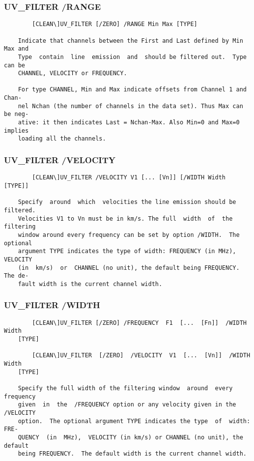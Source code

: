 \subsubsection{UV\_FILTER /RANGE}
\begin{verbatim}
        [CLEAN\]UV_FILTER [/ZERO] /RANGE Min Max [TYPE]

    Indicate that channels between the First and Last defined by Min Max and
    Type  contain  line  emission  and  should be filtered out.  Type can be
    CHANNEL, VELOCITY or FREQUENCY.

    For type CHANNEL, Min and Max indicate offsets from Channel 1 and  Chan-
    nel Nchan (the number of channels in the data set). Thus Max can be neg-
    ative: it then indicates Last = Nchan-Max. Also Min=0 and Max=0  implies
    loading all the channels.

\end{verbatim}
\subsubsection{UV\_FILTER /VELOCITY}
\begin{verbatim}
        [CLEAN\]UV_FILTER /VELOCITY V1 [... [Vn]] [/WIDTH Width [TYPE]]

    Specify  around  which  velocities the line emission should be filtered.
    Velocities V1 to Vn must be in km/s. The full  width  of  the  filtering
    window around every frequency can be set by option /WIDTH.  The optional
    argument TYPE indicates the type of width: FREQUENCY (in MHz),  VELOCITY
    (in  km/s)  or  CHANNEL (no unit), the default being FREQUENCY.  The de-
    fault width is the current channel width.

\end{verbatim}
\subsubsection{UV\_FILTER /WIDTH}
\begin{verbatim}
        [CLEAN\]UV_FILTER [/ZERO] /FREQUENCY  F1  [...  [Fn]]  /WIDTH  Width
    [TYPE]

        [CLEAN\]UV_FILTER  [/ZERO]  /VELOCITY  V1  [...  [Vn]]  /WIDTH Width
    [TYPE]

    Specify the full width of the filtering window  around  every  frequency
    given  in  the  /FREQUENCY option or any velocity given in the /VELOCITY
    option.  The optional argument TYPE indicates the type  of  width:  FRE-
    QUENCY  (in  MHz),  VELOCITY (in km/s) or CHANNEL (no unit), the default
    being FREQUENCY.  The default width is the current channel width.

\end{verbatim}
